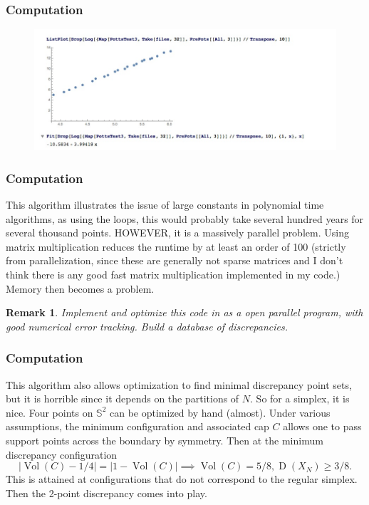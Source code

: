 \documentclass{beamer}
\newtheorem{remark}[equation]{Remark}
\theoremstyle{definition}
\begin{document}
\frame
{
\frametitle{Computation}
\begin{figure}[htbp]
   \centering
   \includegraphics[scale=.4]{runtime.jpeg} %
\end{figure}

}


\frame
{
\frametitle{Computation}
This algorithm illustrates the issue of large constants in polynomial time algorithms, as using the loops, this would probably take several hundred years for several thousand points.  HOWEVER, it is a massively parallel problem.  Using matrix multiplication reduces the runtime by at least an order of 100 (strictly from parallelization, since these are generally not sparse matrices and I don't think there is any good fast matrix multiplication implemented in my code.) Memory then becomes a problem. \begin{remark}Implement and optimize this code in as a open parallel program, with good numerical error tracking.  Build a database of discrepancies.\end{remark}
}

\frame
{
\frametitle{Computation}
This algorithm also allows optimization to find minimal discrepancy point sets, but it is horrible since it depends on the partitions of $N$. So for a simplex, it is nice.  Four points on $\mathbb{S}^2$ can be optimized by hand (almost).  
Under various assumptions, the minimum configuration and associated cap $C$ allows one to pass support points across the boundary by symmetry. Then at the minimum discrepancy configuration
\[
 |\operatorname{Vol}(C) - 1/4 | = |1-\operatorname{Vol}(C)| \implies \operatorname{Vol}(C)= 5/8,  \operatorname{D}(X_N) \ge 3/8.
\]
This is attained at configurations that do not correspond to the regular simplex.  Then the 2-point discrepancy comes into play.%

}
\end{document}
